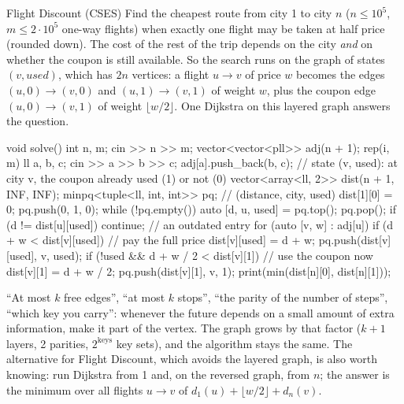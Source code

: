 \begin{problem}{Flight Discount (CSES)}
Find the cheapest route from city 1 to city $n$ ($n \le 10^5$, $m \le 2\cdot10^5$ one-way flights) when exactly one flight may
be taken at half price (rounded down).
\solution The cost of the rest of the trip depends on the city \emph{and} on whether the coupon is still available. So the
search runs on the graph of states $(v, \mathit{used})$, which has $2n$ vertices: a flight $u \to v$ of price $w$ becomes the
edges $(u, 0) \to (v, 0)$ and $(u, 1) \to (v, 1)$ of weight $w$, plus the coupon edge $(u, 0) \to (v, 1)$ of weight
$\lfloor w/2 \rfloor$. One Dijkstra on this layered graph answers the question.
\end{problem}

\begin{code}
void solve() {
    int n, m;
    cin >> n >> m;
    vector<vector<pll>> adj(n + 1);
    rep(i, m) {
        ll a, b, c;
        cin >> a >> b >> c;
        adj[a].push_back({b, c});
    }
    // state (v, used): at city v, the coupon already used (1) or not (0)
    vector<array<ll, 2>> dist(n + 1, {INF, INF});
    minpq<tuple<ll, int, int>> pq;  // (distance, city, used)
    dist[1][0] = 0;
    pq.push({0, 1, 0});
    while (!pq.empty()) {
        auto [d, u, used] = pq.top();
        pq.pop();
        if (d != dist[u][used]) continue;  // an outdated entry
        for (auto [v, w] : adj[u]) {
            if (d + w < dist[v][used]) {  // pay the full price
                dist[v][used] = d + w;
                pq.push({dist[v][used], v, used});
            }
            if (!used && d + w / 2 < dist[v][1]) {  // use the coupon now
                dist[v][1] = d + w / 2;
                pq.push({dist[v][1], v, 1});
            }
        }
    }
    print(min(dist[n][0], dist[n][1]));
}
\end{code}

\begin{trick}
``At most $k$ free edges'', ``at most $k$ stops'', ``the parity of the number of steps'', ``which key you carry'': whenever the
future depends on a small amount of extra information, make it part of the vertex. The graph grows by that factor ($k + 1$
layers, 2 parities, $2^{\text{keys}}$ key sets), and the algorithm stays the same. The alternative for Flight Discount, which
avoids the layered graph, is also worth knowing: run Dijkstra from 1 and, on the reversed graph, from $n$; the answer is the
minimum over all flights $u \to v$ of $d_1(u) + \lfloor w/2\rfloor + d_n(v)$.
\end{trick}

